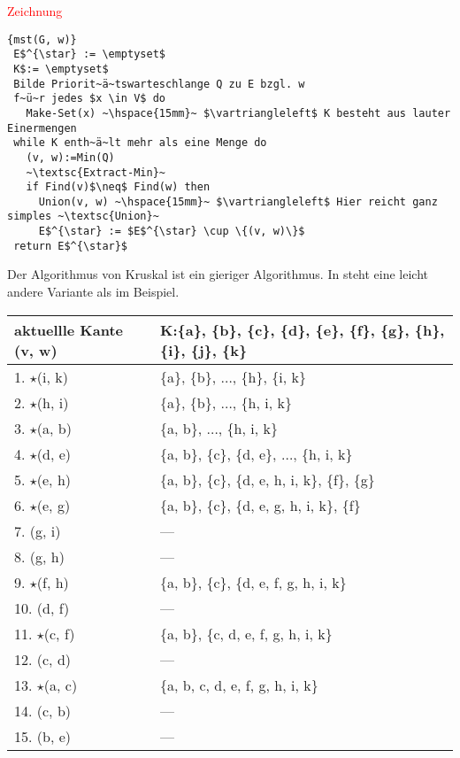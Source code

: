 \textcolor{red}{Zeichnung}

\begin{Algorithmus}[H]
\begin{lstlisting}[frame=tlrb, mathescape=true, title=\textsc{mst\textnormal{(G, w)}}, gobble=1]{mst(G, w)}
 E$^{\star} := \emptyset$
 K$:= \emptyset$
 Bilde Priorit~ä~tswarteschlange Q zu E bzgl. w
 f~ü~r jedes $x \in V$ do
   Make-Set(x) ~\hspace{15mm}~ $\vartriangleleft$ K besteht aus lauter Einermengen
 while K enth~ä~lt mehr als eine Menge do
   (v, w):=Min(Q)
   ~\textsc{Extract-Min}~
   if Find(v)$\neq$ Find(w) then
     Union(v, w) ~\hspace{15mm}~ $\vartriangleleft$ Hier reicht ganz simples ~\textsc{Union}~
     E$^{\star} := $E$^{\star} \cup \{(v, w)\}$
 return E$^{\star}$   
\end{lstlisting}
Der Algorithmus von Kruskal ist ein gieriger Algorithmus. In \cite{cormen} steht eine leicht andere Variante als im
Beispiel.
\end{Algorithmus}

\begin{tabular}{|l|l|}
aktuellle Kante (v, w) & K:\{a\}, \{b\}, \{c\}, \{d\}, \{e\}, \{f\}, \{g\}, \{h\}, \{i\}, \{j\}, \{k\}\\
\hline
1.  $\star$(i, k) & \{a\}, \{b\}, $\ldots$, \{h\}, \{i, k\}\\
2.  $\star$(h, i) & \{a\}, \{b\}, $\ldots$, \{h, i, k\}\\
3.  $\star$(a, b) & \{a, b\}, $\ldots$, \{h, i, k\}\\
\hline
4.  $\star$(d, e) & \{a, b\}, \{c\}, \{d, e\}, $\ldots$, \{h, i, k\}\\
5.  $\star$(e, h) & \{a, b\}, \{c\}, \{d, e, h, i, k\}, \{f\}, \{g\}\\
6.  $\star$(e, g) & \{a, b\}, \{c\}, \{d, e, g, h, i, k\}, \{f\}\\
\hline
7.  (g, i) & ---\\
8.  (g, h) & ---\\
9.  $\star$(f, h) & \{a, b\}, \{c\}, \{d, e, f, g, h, i, k\}\\
\hline
10.  (d, f) & ---\\
11.  $\star$(c, f) & \{a, b\}, \{c, d, e, f, g, h, i, k\}\\
12.  (c, d) & ---\\
\hline
13.  $\star$(a, c) & \{a, b, c, d, e, f, g, h, i, k\}\\
14.  (c, b) & ---\\
15.  (b, e) & ---\\
\end{tabular}

